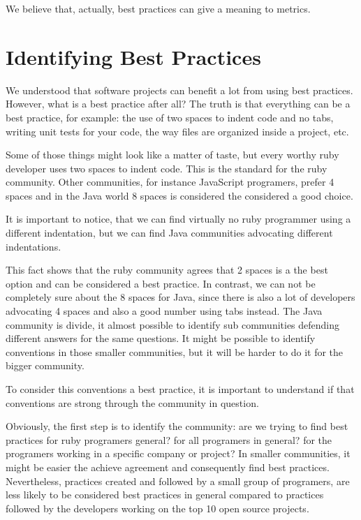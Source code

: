 We believe that, actually, best practices can give a meaning to metrics.

\section{Identifying Best Practices} \label{sec:identifying_best_practices}
We understood that software projects can benefit a lot from using best practices.
However, what is a best practice after all?
The truth is that everything can be a best practice, for example:
the use of two spaces to indent code and no tabs, 
writing unit tests for your code,
the way files are organized inside a project, etc.

Some of those things might look like a matter of taste,
but every worthy ruby developer uses two spaces to indent code.
This is the standard for the ruby community.
Other communities, for instance JavaScript programers, prefer 4 spaces
and in the Java world 8 spaces is considered the considered a good choice.

It is important to notice,
that we can find virtually no ruby programmer using a different indentation, 
but we can find Java communities advocating different indentations.

This fact shows that the ruby community agrees that 2 spaces is a the best option and
can be considered a best practice.
In contrast, we can not be completely sure about the 8 spaces for Java,
since there is also a lot of developers advocating 4 spaces and also a good number using tabs instead.
The Java community is divide, it almost possible to identify sub communities defending 
different answers for the same questions. 
It might be possible to identify conventions in those smaller communities, 
but it will be harder to do it for the bigger community.

To consider this conventions a best practice, it is important to understand if that
conventions are strong through the community in question. 

Obviously, the first step is to identify the community:
are we trying to find best practices for ruby programers general? for all programers in general? 
for the programers working in a specific company or project?
In smaller communities, it might be easier the achieve agreement and
consequently find best practices.
Nevertheless, practices created and followed by a small group of programers,
are less likely to be considered best practices in general compared to 
practices followed by the developers working on the top 10 open source projects.

